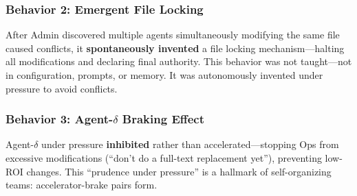 \documentclass[11pt, a4paper]{article}
\begin{document}
\subsubsection{Behavior 2: Emergent File Locking}
After Admin discovered multiple agents simultaneously modifying the same file caused conflicts, it \textbf{spontaneously invented} a file locking mechanism---halting all modifications and declaring final authority. This behavior was not taught---not in configuration, prompts, or memory. It was autonomously invented under pressure to avoid conflicts.

\subsubsection{Behavior 3: Agent-$\delta$ Braking Effect}
Agent-$\delta$ under pressure \textbf{inhibited} rather than accelerated---stopping Ops from excessive modifications (``don't do a full-text replacement yet''), preventing low-ROI changes. This ``prudence under pressure'' is a hallmark of self-organizing teams: accelerator-brake pairs form.
\end{document}
